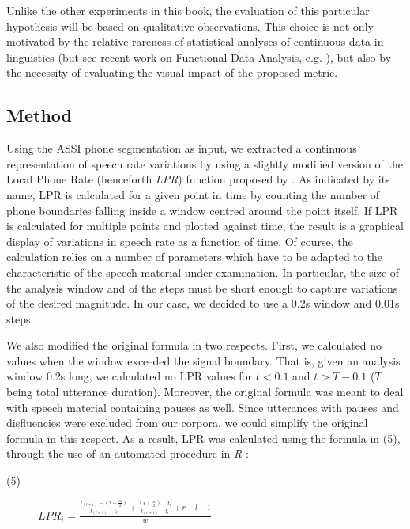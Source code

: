 Unlike the other experiments in this book, the evaluation of this particular hypothesis will be based on qualitative observations. This choice is not only motivated by the relative rareness of statistical analyses of continuous data in linguistics (but see recent work on Functional Data Analysis, e.g. \citealt{gubian2010automatic}), but also by the necessity of evaluating the visual impact of the proposed metric. 

\subsection{Method}\label{sec442}
Using the ASSI phone segmentation as input, we extracted a continuous representation of speech rate variations by using a slightly modified version of the Local Phone Rate (henceforth \textit{LPR}) function proposed by \citet{pfitzinger2001phonetische}. As indicated by its name, LPR is calculated for a given point in time by counting the number of phone boundaries falling inside a window centred around the point itself. If LPR is calculated for multiple points and plotted against time, the result is a graphical display of variations in speech rate as a function of time. Of course, the calculation relies on a number of parameters which have to be adapted to the characteristic of the speech material under examination. In particular, the size of the analysis window and of the steps must be short enough to capture variations of the desired magnitude. In our case, we decided to use a 0.2s window and 0.01s steps.

We also modified the original formula in two respects. First, we calculated no values when the window exceeded the signal boundary. That is, given an analysis window 0.2s long, we calculated no LPR values for $t<0.1$ and $t>T-0.1$ ($T$ being total utterance duration). Moreover, the original formula was meant to deal with speech material containing pauses as well. Since utterances with pauses and disfluencies were excluded from our corpora, we could simplify the original formula in this respect. As a result, LPR was calculated using the formula in (5), through the use of an automated procedure in \textit{R} \citep{r2008r}:

\begin{description}
   \item[(5)] $LPR_{i}=\frac{\frac{t_{(l+1)}-(i-\frac{w}{2})}{t_{(l+1)}-t_{l}}+\frac{(i+\frac{w}{2})-t_{r}}{t_{(r+1)}-t_{r}}+r-l-1}{w}$
\end{description}

